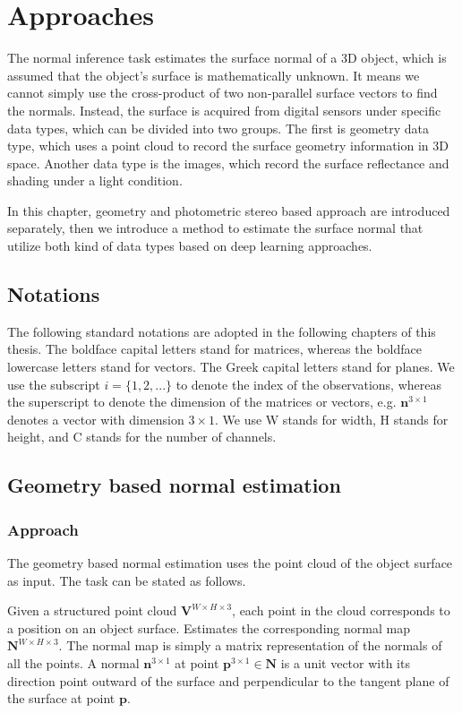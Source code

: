 \chapter{Approaches} %

\label{ch:03} %
The normal inference task estimates the surface normal of a 3D object, which is assumed that the object's surface is mathematically unknown. It means we cannot simply use the cross-product of two non-parallel surface vectors to find the normals. Instead, the surface is acquired from digital sensors under specific data types, which can be divided into two groups. The first is geometry data type, which uses a point cloud to record the surface geometry information in 3D space. 
Another data type is the images, which record the surface reflectance and shading under a light condition. 

In this chapter, geometry and photometric stereo based approach are introduced separately, then we introduce a method to estimate the surface normal that utilize both kind of data types based on deep learning approaches.

\section{Notations}

The following standard notations are adopted in the following chapters of this thesis. The boldface capital letters stand for matrices, whereas the boldface lowercase letters stand for vectors. The Greek capital letters stand for planes.
We use the subscript $ i= \{1,2,...\} $ to denote the index of the observations, whereas the superscript to denote the dimension of the matrices or vectors, e.g. $ \textbf{n}^{3\times 1} $ denotes a vector with dimension $ 3\times1 $. We use W stands for width, H stands for height, and C stands for the number of channels.

\section{Geometry based normal estimation}

\subsection{Approach}
The geometry based normal estimation uses the point cloud of the object surface as input. The task can be stated as follows.

Given a structured point cloud $ \textbf{V}^{W\times H\times 3} $, each point in the cloud corresponds to a position on an object surface. Estimates the corresponding normal map  $ \textbf{N}^{W\times H \times 3} $. The normal map is simply a matrix representation of the normals of all the points. A normal  $ \textbf{n}^{3\times 1} $ at point   $ \textbf{p}^{3\times 1} \in \textbf{N} $ is a unit vector with its direction point outward of the surface and perpendicular to the tangent plane of the surface at point $ \textbf{p} $.

